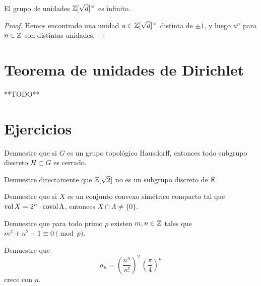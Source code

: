 \begin{corolario}
  El grupo de unidades $\mathbb{Z} [\sqrt{d}]^\times$ es infinito.

  \begin{proof}
    Hemos encontrado una unidad $u \in \mathbb{Z} [\sqrt{d}]^\times$ distinta de
    $\pm 1$, y luego $u^n$ para $n \in \mathbb{Z}$ son distintas unidades.
  \end{proof}
\end{corolario}


\section{Teorema de unidades de Dirichlet}

**TODO**
\fi


\pagebreak


\section*{Ejercicios}

\begin{ejercicio}
  Demuestre que si $G$ es un grupo topológico Hausdorff, entonces todo subgrupo
  discreto $H \subset G$ es cerrado.
\end{ejercicio}

\begin{ejercicio}
  Demuestre directamente que $\mathbb{Z} [\sqrt{2}]$ no es un subgrupo discreto de
  $\mathbb{R}$.
\end{ejercicio}

\begin{ejercicio}
  Demuestre que si $X$ es un conjunto convexo simétrico compacto tal que
  $\operatorname{vol} X = 2^n\cdot \operatorname{covol} \Lambda$, entonces $X \cap \Lambda \ne \{ 0 \}$.
\end{ejercicio}

\begin{ejercicio}
  Demuestre que para todo primo $p$ existen $m,n \in \mathbb{Z}$ tales que
  $m^2 + n^2 + 1 \equiv 0 \pmod{p}$.
\end{ejercicio}

\begin{ejercicio}
  Demuestre que
  $$a_n = \left(\frac{n^n}{n!}\right)^2\,\left(\frac{\pi}{4}\right)^n$$
  crece con $n$.
\end{ejercicio}

